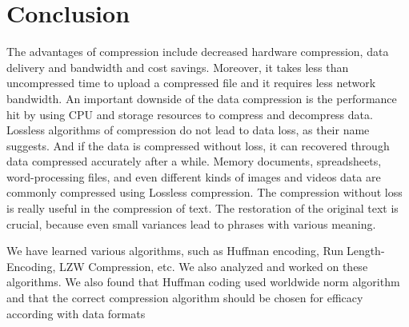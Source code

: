\documentclass[a4paper, 12pt]{article}
\begin{document}
\newpage
\section{Conclusion}
\par The advantages of compression include decreased hardware compression, data delivery 
and bandwidth and cost savings. Moreover, it takes less than uncompressed time to 
upload a compressed file and it requires less network bandwidth. An important 
downside of the data compression is the performance hit by using CPU and storage 
resources to compress and decompress data. Lossless algorithms of compression do not 
lead to data loss, as their name suggests. And if the data is compressed without loss, it 
can recovered through data compressed accurately after a while. Memory documents, 
spreadsheets, word-processing files, and even different kinds of images and videos data 
are commonly compressed using Lossless compression. The compression without loss 
is really useful in the compression of text. The restoration of the original text is crucial, 
because even small variances lead to phrases with various meaning.
\\
\par We have learned various algorithms, such as Huffman encoding, RunLength-Encoding, LZW Compression, etc. We also analyzed and worked on these 
algorithms. We also found that Huffman coding used worldwide norm algorithm and 
that the correct compression algorithm should be chosen for efficacy according with
data formats
\\


\newpage
%
%

\end{document}
